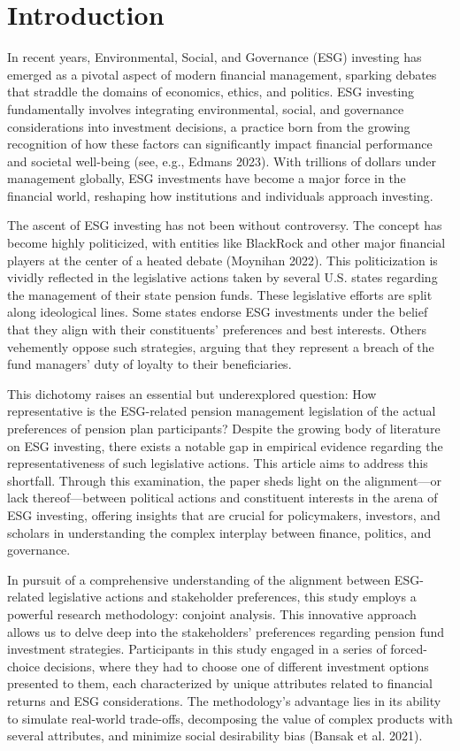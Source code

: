\documentclass[
  12pt,
]{article}
\begin{document}
\hypertarget{introduction}{%
\section{Introduction}\label{introduction}}

In recent years, Environmental, Social, and Governance (ESG) investing has emerged as a pivotal aspect of modern financial management, sparking debates that straddle the domains of economics, ethics, and politics. ESG investing fundamentally involves integrating environmental, social, and governance considerations into investment decisions, a practice born from the growing recognition of how these factors can significantly impact financial performance and societal well-being (see, e.g., Edmans 2023). With trillions of dollars under management globally, ESG investments have become a major force in the financial world, reshaping how institutions and individuals approach investing.

The ascent of ESG investing has not been without controversy. The concept has become highly politicized, with entities like BlackRock and other major financial players at the center of a heated debate (Moynihan 2022). This politicization is vividly reflected in the legislative actions taken by several U.S. states regarding the management of their state pension funds. These legislative efforts are split along ideological lines. Some states endorse ESG investments under the belief that they align with their constituents' preferences and best interests. Others vehemently oppose such strategies, arguing that they represent a breach of the fund managers' duty of loyalty to their beneficiaries.

This dichotomy raises an essential but underexplored question: How representative is the ESG-related pension management legislation of the actual preferences of pension plan participants? Despite the growing body of literature on ESG investing, there exists a notable gap in empirical evidence regarding the representativeness of such legislative actions. This article aims to address this shortfall. Through this examination, the paper sheds light on the alignment---or lack thereof---between political actions and constituent interests in the arena of ESG investing, offering insights that are crucial for policymakers, investors, and scholars in understanding the complex interplay between finance, politics, and governance.

In pursuit of a comprehensive understanding of the alignment between ESG-related legislative actions and stakeholder preferences, this study employs a powerful research methodology: conjoint analysis. This innovative approach allows us to delve deep into the stakeholders' preferences regarding pension fund investment strategies. Participants in this study engaged in a series of forced-choice decisions, where they had to choose one of different investment options presented to them, each characterized by unique attributes related to financial returns and ESG considerations. The methodology's advantage lies in its ability to simulate real-world trade-offs, decomposing the value of complex products with several attributes, and minimize social desirability bias (Bansak et al. 2021).
\end{document}

